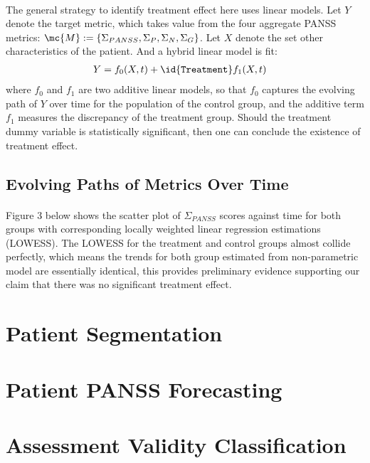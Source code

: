 \documentclass[11pt]{article}
\begin{document}
	
	\paragraph{}The general strategy to identify treatment effect here uses linear models. Let $Y$ denote the target metric, which takes value from the four aggregate PANSS metrics: $\mc{M} := \{ \Sigma_{PANSS}, \Sigma_P, \Sigma_N, \Sigma_G\}$. Let $X$ denote the set other characteristics of the patient. And a hybrid linear model is fit:
	\begin{align}
		Y &= f_0(X, t) + \id{\texttt{Treatment}} f_1(X, t)
	\end{align}
	where $f_0$ and $f_1$ are two additive linear models, so that $f_0$ captures the evolving path of $Y$ over time for the population of the control group, and the additive term $f_1$ measures the discrepancy of the treatment group.
	Should the treatment dummy variable is statistically significant, then one can conclude the existence of treatment effect.
	\subsection{Evolving Paths of Metrics Over Time}
	\paragraph{}Figure 3 below shows the scatter plot of $\Sigma_{PANSS}$ scores against time for both groups with corresponding locally weighted linear regression estimations (LOWESS). The LOWESS for the treatment and control groups almost collide perfectly, which means the trends for both group estimated from non-parametric model are essentially identical, this provides preliminary evidence supporting our claim that there was no significant treatment effect. 
	
	\section{Patient Segmentation}
	\section{Patient PANSS Forecasting}
	\section{Assessment Validity Classification}
\end{document}
